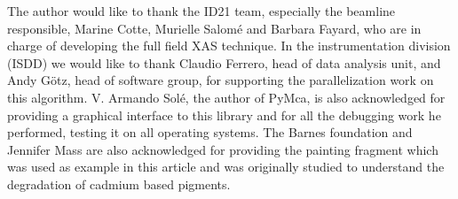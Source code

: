 \documentclass[preprint]{iucr}
\begin{document}

The author would like to thank the ID21 team, especially the beamline
responsible, Marine Cotte, Murielle Salomé and Barbara Fayard, who are in charge
of developing the full field XAS technique.
In the instrumentation division (ISDD) we would like to thank Claudio Ferrero,
head of data analysis unit, and Andy G\"otz, head of software group, for
supporting the parallelization work on this algorithm.
V. Armando Solé, the
author of PyMca, is also acknowledged for providing a graphical interface to
this library and for all the debugging work he performed, testing it on all
operating systems.
The Barnes foundation and Jennifer Mass are also acknowledged for providing
the painting fragment which was used as example in this article and was originally studied to
understand the degradation of cadmium based pigments.


\end{document}
